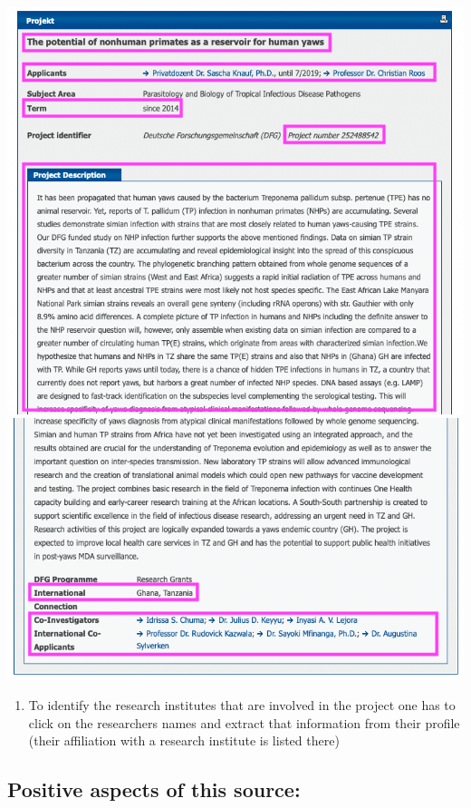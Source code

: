 \documentclass[
]{book}
\providecommand{\tightlist}{%
  \setlength{\itemsep}{0pt}\setlength{\parskip}{0pt}}
\begin{document}
\includegraphics{images/gepris1.png}
\includegraphics{images/gepris2.png}

\begin{enumerate}
\def\labelenumi{\arabic{enumi}.}
\setcounter{enumi}{9}
\tightlist
\item
  To identify the research institutes that are involved in the project one has to click on the researchers names and extract that information from their profile (their affiliation with a research institute is listed there)
\end{enumerate}

\hypertarget{positive-aspects-of-this-source}{%
\subsection{Positive aspects of this source:}\label{positive-aspects-of-this-source}}
\end{document}
